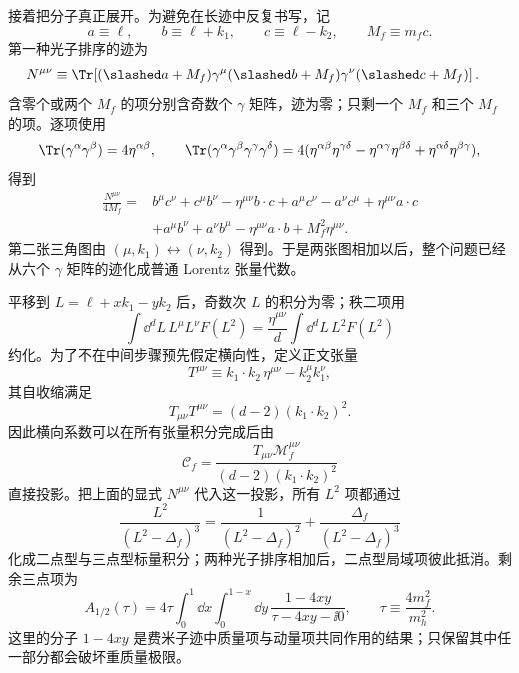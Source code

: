 \begin{derivation}
接着把分子真正展开。为避免在长迹中反复书写，记
\[
a\equiv\ell,\qquad b\equiv\ell+k_1,\qquad c\equiv\ell-k_2,
\qquad M_f\equiv m_fc.
\]
第一种光子排序的迹为
\begin{align*}
N^{\mu\nu}
&\equiv\Tr\!\left[(\slashed a+M_f)\gamma^\mu
(\slashed b+M_f)\gamma^\nu(\slashed c+M_f)\right].
\end{align*}
含零个或两个 $M_f$ 的项分别含奇数个 $\gamma$ 矩阵，迹为零；只剩一个 $M_f$ 和三个 $M_f$ 的项。逐项使用
\[
\Tr(\gamma^\alpha\gamma^\beta)=4\eta^{\alpha\beta},\qquad
\Tr(\gamma^\alpha\gamma^\beta\gamma^\gamma\gamma^\delta)
=4(\eta^{\alpha\beta}\eta^{\gamma\delta}
-\eta^{\alpha\gamma}\eta^{\beta\delta}
+\eta^{\alpha\delta}\eta^{\beta\gamma}),
\]
得到
\begin{align*}
\frac{N^{\mu\nu}}{4M_f}
={}&b^\mu c^\nu+c^\mu b^\nu-\eta^{\mu\nu}b\!\cdot c
+a^\mu c^\nu-a^\nu c^\mu+\eta^{\mu\nu}a\!\cdot c\\
&+a^\mu b^\nu+a^\nu b^\mu-\eta^{\mu\nu}a\!\cdot b
+M_f^2\eta^{\mu\nu}.
\end{align*}
第二张三角图由 $(\mu,k_1)\leftrightarrow(\nu,k_2)$ 得到。于是两张图相加以后，整个问题已经从六个 $\gamma$ 矩阵的迹化成普通 Lorentz 张量代数。

平移到 $L=\ell+xk_1-yk_2$ 后，奇数次 $L$ 的积分为零；秩二项用
\begin{equation*}
\int\dd^dL\,L^\mu L^\nu F(L^2)
=\frac{\eta^{\mu\nu}}{d}\int\dd^dL\,L^2F(L^2)
\end{equation*}
约化。为了不在中间步骤预先假定横向性，定义正文张量
\[
T^{\mu\nu}\equiv k_1\!\cdot k_2\,\eta^{\mu\nu}-k_2^\mu k_1^\nu,
\]
其自收缩满足
\begin{equation*}
T_{\mu\nu}T^{\mu\nu}=(d-2)(k_1\!\cdot k_2)^2.
\end{equation*}
因此横向系数可以在所有张量积分完成后由
\begin{equation*}
\mathcal C_f
=\frac{T_{\mu\nu}\mathcal M_f^{\mu\nu}}
{(d-2)(k_1\!\cdot k_2)^2}
\end{equation*}
直接投影。把上面的显式 $N^{\mu\nu}$ 代入这一投影，所有 $L^2$ 项都通过
\begin{equation*}
\frac{L^2}{(L^2-\Delta_f)^3}
=\frac1{(L^2-\Delta_f)^2}
+\frac{\Delta_f}{(L^2-\Delta_f)^3}
\end{equation*}
化成二点型与三点型标量积分；两种光子排序相加后，二点型局域项彼此抵消。剩余三点项为
\begin{equation*}
 A_{1/2}(\tau)
 =4\tau\int_0^1\dd x\int_0^{1-x}\dd y\,
 \frac{1-4xy}{\tau-4xy-\ii0},
 \qquad
 \tau\equiv\frac{4m_f^2}{m_h^2}.
\end{equation*}
这里的分子 $1-4xy$ 是费米子迹中质量项与动量项共同作用的结果；只保留其中任一部分都会破坏重质量极限。


\end{derivation}
